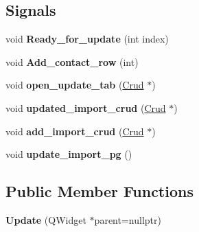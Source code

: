 \subsection*{Signals}
\begin{DoxyCompactItemize}
\item 
\mbox{\label{class_update_abd2f74ee5e866a1c18459522af68016e}} 
void {\bfseries Ready\+\_\+for\+\_\+update} (int index)
\item 
\mbox{\label{class_update_ac363b4e2e872873fd6d23eca5102329e}} 
void {\bfseries Add\+\_\+contact\+\_\+row} (int)
\item 
\mbox{\label{class_update_ab52f1de1ec7c598a7d5ac823832ec1d8}} 
void {\bfseries open\+\_\+update\+\_\+tab} (\mbox{\hyperlink{class_crud}{Crud}} $\ast$)
\item 
\mbox{\label{class_update_ab8c836bdb5bf08a490c50c694249b46d}} 
void {\bfseries updated\+\_\+import\+\_\+crud} (\mbox{\hyperlink{class_crud}{Crud}} $\ast$)
\item 
\mbox{\label{class_update_aeab6401741195a2b1a568a9494b87ed0}} 
void {\bfseries add\+\_\+import\+\_\+crud} (\mbox{\hyperlink{class_crud}{Crud}} $\ast$)
\item 
\mbox{\label{class_update_aef48829e4e2bb4cafe11a0f33099d2de}} 
void {\bfseries update\+\_\+import\+\_\+pg} ()
\end{DoxyCompactItemize}
\subsection*{Public Member Functions}
\begin{DoxyCompactItemize}
\item 
\mbox{\label{class_update_aa4739ce246ffdcbe087f76f7d19af197}} 
{\bfseries Update} (Q\+Widget $\ast$parent=nullptr)
\end{DoxyCompactItemize}
